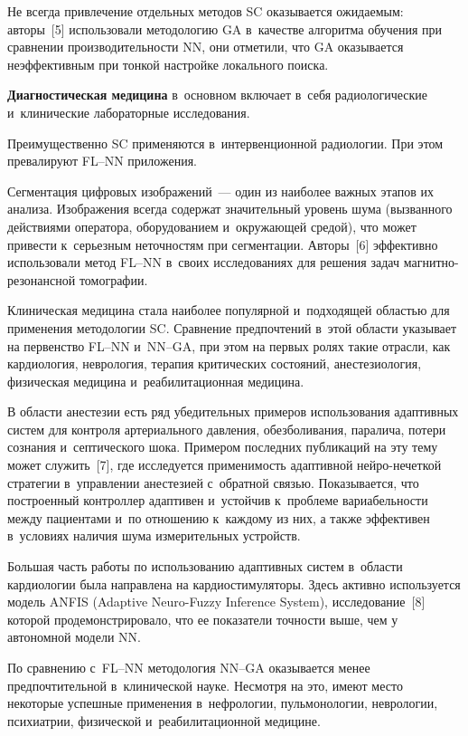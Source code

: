 \begin{multicols}{2}
     Не всегда привлечение отдельных методов SC оказывается ожидаемым: 
авторы~[5] использовали методологию GA в~качестве алгоритма обучения при 
сравнении производительности NN, они отметили, что GA оказывается 
неэффективным при тонкой настройке локального поиска.
     
     \textbf{Диагностическая медицина} в~основном включает в~себя 
радиологические и~клинические лабораторные исследования.
     
     Преимущественно SC применяются в~интервенционной радиологии. При 
этом превалируют FL--NN приложения.
       
     Сегментация цифровых изображений~--- один из наиболее важных 
этапов их анализа. Изображения всегда содержат значительный уровень шума 
(вызванного действиями оператора, оборудованием и~окружающей средой), что 
может привести к~серь\-ез\-ным неточностям при сегментации. Авторы~[6] 
эффективно использовали метод FL--NN в~своих исследованиях для решения 
задач маг\-нит\-но-ре\-зо\-нанс\-ной томографии.
     
     Клиническая медицина стала наиболее популярной и~подходящей 
областью для применения методологии SC. Сравнение предпочтений в~этой 
области указывает на первенство FL--NN и~NN--GA, при этом на первых ролях 
такие отрасли, как кардиология, неврология, терапия критических состояний, 
анестезиология, физическая медицина и~реабилитационная медицина.
     
     В области анестезии есть ряд убедительных примеров использования 
адаптивных систем для контроля артериального давления, обезболивания, 
паралича, потери сознания и~септического шока. Примером последних 
публикаций на эту тему может служить~[7], где исследуется применимость 
адаптивной ней\-ро-не\-чет\-кой стратегии в~управлении анестезией с~обратной 
связью. Показывается, что построенный контроллер адаптивен и~устойчив 
к~проблеме вариабельности между пациентами и~по отношению к~каждому из 
них, а также эффективен в~условиях наличия шума измерительных устройств.
     
     Большая часть работы по использованию адап\-тив\-ных систем в~области 
кардиологии была направлена на кардиостимуляторы. Здесь активно 
используется модель ANFIS (Adaptive Neuro-Fuzzy Inference System), 
исследование~[8] которой продемонстрировало, что ее показатели точности 
выше, чем у автономной модели NN.
     
     По сравнению с~FL--NN методология NN--GA оказывается менее 
предпочтительной в~клинической науке. Несмотря на это, имеют место 
некоторые успешные применения в~нефрологии, пульмонологии, неврологии, 
психиатрии, физической и~реабилитационной медицине.
     

\end{multicols}
